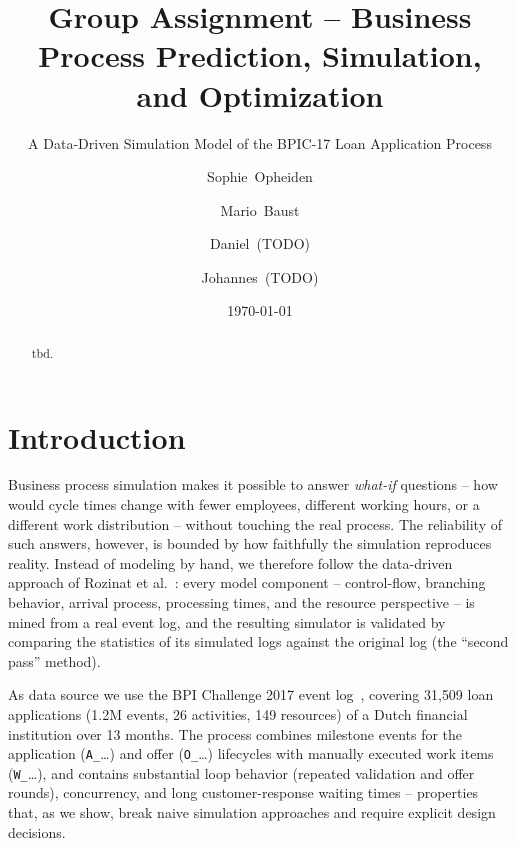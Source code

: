 \documentclass[
  english,        %
  font=times,     %
  twocolumn,      %
]{tumarticle}
\title{Group Assignment -- Business Process Prediction, Simulation, and Optimization}
\subtitle{A Data-Driven Simulation Model of the BPIC-17 Loan Application Process}
\author[email=sophie.opheiden@tum.de]{Sophie~Opheiden}
\author[email=CONFIRM-EMAIL@tum.de]{Mario~Baust}
\author[email=todo@tum.de]{Daniel~(TODO)}
\author[email=todo@tum.de]{Johannes~(TODO)}
\date\today
\begin{document}
\maketitle

\begin{abstract}
tbd.
\end{abstract}
%

\section{Introduction}
Business process simulation makes it possible to answer \emph{what-if}
questions -- how would cycle times change with fewer employees, different
working hours, or a different work distribution -- without touching the real
process. The reliability of such answers, however, is bounded by how
faithfully the simulation reproduces reality. Instead of modeling by hand, we
therefore follow the data-driven approach of Rozinat et
al.~\cite{rozinat2009discovering}: every model component -- control-flow,
branching behavior, arrival process, processing times, and the resource
perspective -- is mined from a real event log, and the resulting simulator is
validated by comparing the statistics of its simulated logs against the
original log (the ``second pass'' method).

As data source we use the BPI Challenge 2017 event
log~\cite{vandongen2017bpic}, covering 31{,}509 loan applications
(1.2M events, 26 activities, 149 resources) of a Dutch financial institution
over 13 months. The process combines milestone events for the application
(\texttt{A\_}\dots) and offer (\texttt{O\_}\dots) lifecycles with manually
executed work items (\texttt{W\_}\dots), and contains substantial loop
behavior (repeated validation and offer rounds), concurrency, and long
customer-response waiting times -- properties that, as we show, break naive
simulation approaches and require explicit design decisions.
\end{document}
